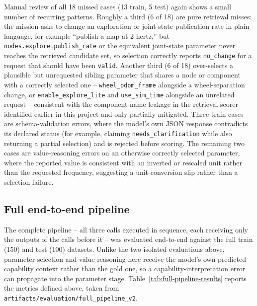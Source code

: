 Manual review of all 18 missed cases (13 train, 5 test) again shows a small number of recurring patterns. Roughly a third (6 of 18) are pure retrieval misses: the mission asks to change an exploration or joint-state publication rate in plain language, for example ``publish a map at 2 hertz,'' but \texttt{nodes.explore.publish\_rate} or the equivalent joint-state parameter never reaches the retrieved candidate set, so selection correctly reports \texttt{no\_change} for a request that should have been \texttt{valid}. Another third (6 of 18) over-selects a plausible but unrequested sibling parameter that shares a node or component with a correctly selected one -- \texttt{wheel\_odom\_frame} alongside a wheel-separation change, or \texttt{enable\_explore\_lite} and \texttt{use\_sim\_time} alongside an unrelated request -- consistent with the component-name leakage in the retrieval scorer identified earlier in this project and only partially mitigated. Three train cases are schema-validation errors, where the model's own JSON response contradicts its declared status (for example, claiming \texttt{needs\_clarification} while also returning a partial selection) and is rejected before scoring. The remaining two cases are value-reasoning errors on an otherwise correctly selected parameter, where the reported value is consistent with an inverted or rescaled unit rather than the requested frequency, suggesting a unit-conversion slip rather than a selection failure.

\subsection{Full end-to-end pipeline}

The complete pipeline -- all three calls executed in sequence, each receiving only the outputs of the calls before it -- was evaluated end-to-end against the full train (150) and test (100) datasets. Unlike the two isolated evaluations above, parameter selection and value reasoning here receive the model's own predicted capability context rather than the gold one, so a capability-interpretation error can propagate into the parameter stage. Table~\ref{tab:full-pipeline-results} reports the metrics defined above, taken from \texttt{artifacts/evaluation/full\_pipeline\_v2}.

